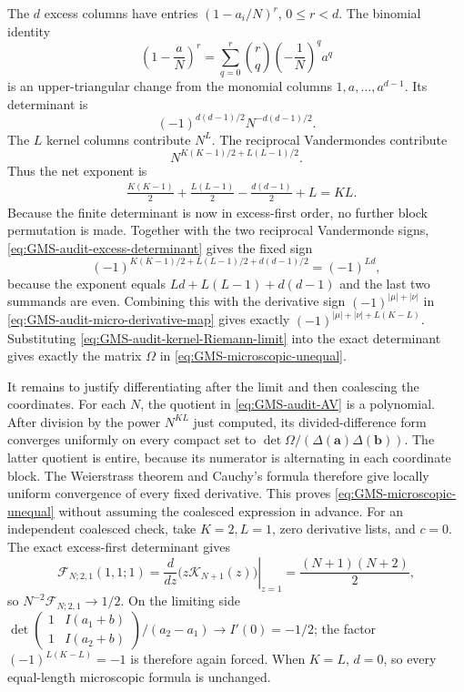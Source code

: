 The $d$ excess columns have entries $(1-a_i/N)^r$, $0\leq r<d$.  The binomial identity
\begin{equation}
 \left(1-\frac aN\right)^r
 =\sum_{q=0}^{r}\binom rq\left(-\frac1N\right)^q a^q
 \label{eq:GMS-audit-excess-binomial}
\end{equation}
is an upper-triangular change from the monomial columns $1,a,\ldots,a^{d-1}$.  Its determinant
is
\begin{equation}
 (-1)^{d(d-1)/2}N^{-d(d-1)/2}.
 \label{eq:GMS-audit-excess-determinant}
\end{equation}
The $L$ kernel columns contribute $N^L$.  The reciprocal Vandermondes contribute
\begin{equation}
 N^{K(K-1)/2+L(L-1)/2}.
\end{equation}
Thus the net exponent is
\begin{align}
 &\frac{K(K-1)}2+\frac{L(L-1)}2
 -\frac{d(d-1)}2+L=KL.
 \label{eq:GMS-audit-KL-exponent}
\end{align}
Because the finite determinant is now in excess-first order, no further block permutation is
made.  Together with the two reciprocal Vandermonde signs,
\eqref{eq:GMS-audit-excess-determinant} gives the fixed sign
\begin{equation}
 (-1)^{K(K-1)/2+L(L-1)/2+d(d-1)/2}=(-1)^{Ld},
 \label{eq:GMS-audit-fixed-sign-parity}
\end{equation}
because the exponent equals
$Ld+L(L-1)+d(d-1)$ and the last two summands are even.  Combining this with the derivative
sign $(-1)^{|\mu|+|\nu|}$ in \eqref{eq:GMS-audit-micro-derivative-map} gives exactly
$(-1)^{|\mu|+|\nu|+L(K-L)}$.  Substituting
\eqref{eq:GMS-audit-kernel-Riemann-limit} into the exact determinant gives exactly the matrix
$\Omega$ in \eqref{eq:GMS-microscopic-unequal}.

It remains to justify differentiating after the limit and then coalescing the coordinates.
For each $N$, the quotient in \eqref{eq:GMS-audit-AV} is a polynomial.  After division by the
power $N^{KL}$ just computed, its divided-difference form converges uniformly on every compact
set to $\det\Omega/(\Delta(\mathbf a)\Delta(\mathbf b))$.  The latter quotient is entire,
because its numerator is alternating in each coordinate block.  The Weierstrass theorem and
Cauchy's formula therefore give locally uniform convergence of every fixed derivative.  This
proves \eqref{eq:GMS-microscopic-unequal} without assuming the coalesced expression in
advance.  For an independent coalesced check, take $K=2,L=1$, zero derivative lists, and
$c=0$.  The exact excess-first determinant gives
\begin{equation}
 \mathcal F_{N;2,1}(1,1;1)
 =\left.\frac{d}{dz}\bigl(z\mathcal K_{N+1}(z)\bigr)\right|_{z=1}
 =\frac{(N+1)(N+2)}2,
\end{equation}
so $N^{-2}\mathcal F_{N;2,1}\to1/2$.  On the limiting side
$\det\!\begin{pmatrix}1&I(a_1+b)\\1&I(a_2+b)\end{pmatrix}/(a_2-a_1)
\to I'(0)=-1/2$; the factor
$(-1)^{L(K-L)}=-1$ is therefore again forced.  When $K=L$, $d=0$, so every equal-length
microscopic formula is unchanged.

